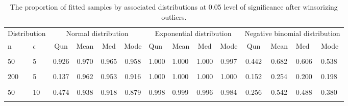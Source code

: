 \documentclass[
]{article}
\begin{document}
\begin{CodeChunk}
\begin{table}[H]

\caption{\label{tab:unnamed-chunk-8}The proportion of fitted samples by associated distributions at 0.05 level of significance after winsorizing outliers.}
\centering
\begin{tabular}[t]{l|l|c|c|c|c|l|l|c|c|c|c|l|l}
\hline
\multicolumn{2}{c|}{Distribution} & \multicolumn{4}{c|}{Normal distribution} & \multicolumn{4}{c|}{Exponential distribution} & \multicolumn{4}{c}{Negative binomial distribution} \\
\cline{1-2} \cline{3-6} \cline{7-10} \cline{11-14}
n & $\epsilon$ & Qun & Mean & Med & Mode & Qun & Mean & Med & Mode & Qun & Mean & Med & Mode\\
\hline
\cellcolor{gray!6}{20} & \cellcolor{gray!6}{5} & \cellcolor{gray!6}{0.961} & \cellcolor{gray!6}{0.970} & \cellcolor{gray!6}{0.949} & \cellcolor{gray!6}{0.924} & \cellcolor{gray!6}{0.999} & \cellcolor{gray!6}{1.000} & \cellcolor{gray!6}{0.996} & \cellcolor{gray!6}{0.984} & \cellcolor{gray!6}{0.748} & \cellcolor{gray!6}{0.912} & \cellcolor{gray!6}{0.878} & \cellcolor{gray!6}{0.848}\\
\hline
50 & 5 & 0.926 & 0.970 & 0.965 & 0.958 & 1.000 & 1.000 & 1.000 & 0.997 & 0.442 & 0.682 & 0.606 & 0.538\\
\hline
\cellcolor{gray!6}{100} & \cellcolor{gray!6}{5} & \cellcolor{gray!6}{0.614} & \cellcolor{gray!6}{0.968} & \cellcolor{gray!6}{0.960} & \cellcolor{gray!6}{0.934} & \cellcolor{gray!6}{1.000} & \cellcolor{gray!6}{1.000} & \cellcolor{gray!6}{1.000} & \cellcolor{gray!6}{1.000} & \cellcolor{gray!6}{0.294} & \cellcolor{gray!6}{0.450} & \cellcolor{gray!6}{0.418} & \cellcolor{gray!6}{0.356}\\
\hline
200 & 5 & 0.137 & 0.962 & 0.953 & 0.916 & 1.000 & 1.000 & 1.000 & 1.000 & 0.152 & 0.254 & 0.200 & 0.198\\
\hline
\cellcolor{gray!6}{20} & \cellcolor{gray!6}{10} & \cellcolor{gray!6}{0.873} & \cellcolor{gray!6}{0.951} & \cellcolor{gray!6}{0.939} & \cellcolor{gray!6}{0.910} & \cellcolor{gray!6}{0.997} & \cellcolor{gray!6}{0.998} & \cellcolor{gray!6}{0.986} & \cellcolor{gray!6}{0.964} & \cellcolor{gray!6}{0.582} & \cellcolor{gray!6}{0.846} & \cellcolor{gray!6}{0.792} & \cellcolor{gray!6}{0.782}\\
\hline
50 & 10 & 0.474 & 0.938 & 0.918 & 0.879 & 0.998 & 0.999 & 0.996 & 0.984 & 0.256 & 0.542 & 0.488 & 0.380\\
\hline
\cellcolor{gray!6}{100} & \cellcolor{gray!6}{10} & \cellcolor{gray!6}{0.060} & \cellcolor{gray!6}{0.890} & \cellcolor{gray!6}{0.873} & \cellcolor{gray!6}{0.805} & \cellcolor{gray!6}{0.998} & \cellcolor{gray!6}{1.000} & \cellcolor{gray!6}{1.000} & \cellcolor{gray!6}{0.998} & \cellcolor{gray!6}{0.090} & \cellcolor{gray!6}{0.352} & \cellcolor{gray!6}{0.314} & \cellcolor{gray!6}{0.234}\\

\end{tabular}
\end{table}
\end{CodeChunk}
\end{document}
